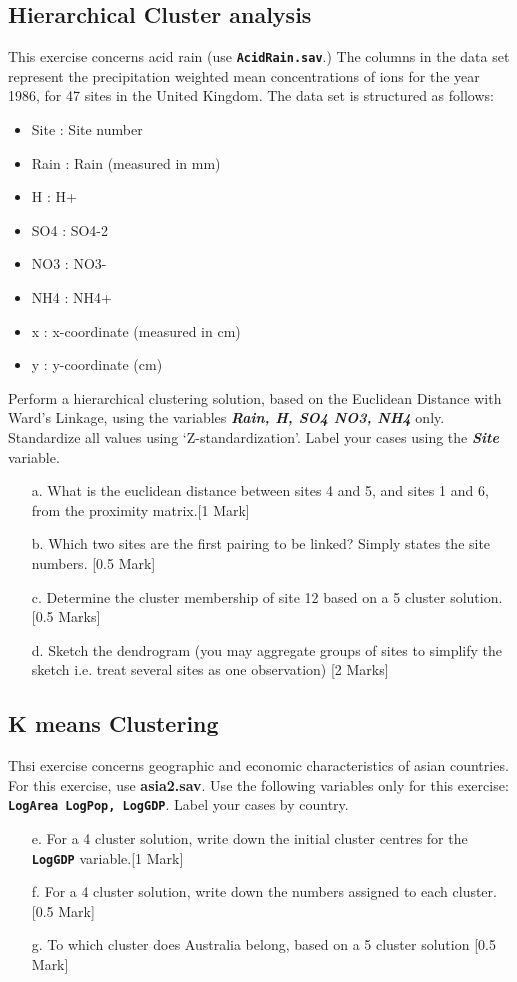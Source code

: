 \documentclass[12pt, a4paper]{article}
\theoremstyle{plain}
\theoremstyle{definition}
\theoremstyle{remark}
\begin{document}
\subsection{Hierarchical Cluster analysis}
This exercise concerns acid rain (use \textbf{\texttt{AcidRain.sav}}.)
The columns in the data set represent the precipitation weighted mean concentrations of ions for the year 1986, for 47 sites in the United Kingdom. The data set is structured as follows:
\begin{itemize}
\item Site : Site number
\item Rain : Rain (measured in mm)
\item H	: H+
\item SO4 : SO4-2
\item NO3 : NO3-
\item NH4 : NH4+
\item x	: x-coordinate (measured in cm)
\item y	: y-coordinate (cm)
\end{itemize}
Perform a hierarchical clustering solution, based on the Euclidean Distance with Ward's Linkage, using the variables \textbf{\textit{Rain, H, SO4 NO3,  NH4}} only. Standardize all values using `Z-standardization'. Label your cases using the \textbf{\textit{Site}} variable.
\newpage
\begin{itemize}
\item[a.] What is the euclidean distance between sites 4 and 5, and sites 1 and 6, from the proximity matrix.[1 Mark]
\item[b.] Which two sites are the first pairing to be linked? Simply states the site numbers. [0.5 Mark]
\item[c.] Determine the cluster membership of site 12 based on a 5 cluster solution. [0.5 Marks]
\item[d.] Sketch the dendrogram (you may aggregate groups of sites to simplify the sketch i.e. treat several sites as one observation) [2 Marks]
\end{itemize}
\newpage
\subsection{K means Clustering}
Thsi exercise concerns geographic and economic characteristics of asian countries. For this exercise, use \textbf{asia2.sav}. Use the following variables only for this exercise: \textbf{\texttt{LogArea
LogPop, LogGDP}}. Label your cases by country.
\begin{itemize}
\item[e.] For a 4 cluster solution, write down the initial cluster centres for the \textbf{\texttt{LogGDP}} variable.[1 Mark]
\item[f.] For a 4 cluster solution, write down the numbers assigned to each cluster. [0.5 Mark]
\item[g.] To which cluster does Australia belong, based on a 5 cluster solution [0.5 Mark]
\end{itemize}
\end{document}

